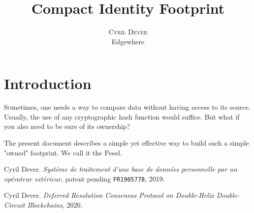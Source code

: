 \documentclass[twoside,twocolumn]{article}
\title{Compact Identity Footprint} %
\author{%
    \textsc{Cyril Dever}\\ %
    \normalsize Edgewhere \\ %
}
\date{\DTMusedate{thedate}}
\theoremstyle{definition}
\theoremstyle{remark}
\begin{document}
\maketitle


\section{Introduction}

\lettrine[nindent=0em,lines=3]{S}ometimes, one needs a way to compare data without having access to its source. Usually, the use of any cryptographic 
hash function would suffice. But what if you also need to be sure of its ownership?

The present document describes a simple yet effective way to build such a simple "owned" footprint.
We call it the Peeel\texttrademark.




\begin{thebibliography}{99} %

Cyril Dever. \emph{Système de traitement d'une base de données personnelle par un opérateur extérieur}, patent pending \texttt{FR1905778}, 2019.

Cyril Dever. \emph{Deferred Resolution Consensus Protocol on Double-Helix Double-Circuit Blockchains}, 2020.

\end{thebibliography}

\end{document}
